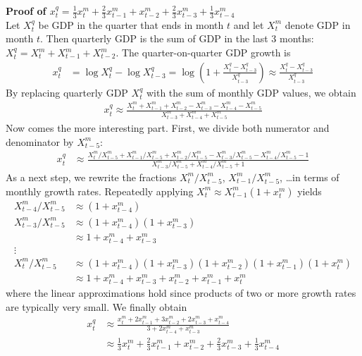 \documentclass[12pt,a4paper]{scrartcl}
\begin{document}
	

\textbf{Proof of $x_t^q = \frac{1}{3} x_t^m + \frac{2}{3} x_{t-1}^m + x_{t-2}^m + \frac{2}{3} x_{t-3}^m + \frac{1}{3} x_{t-4}^m$}\\

Let $X^q_t$ be GDP in the quarter that ends in month $t$ and let $X^m_t$ denote GDP in month $t$. Then quarterly GDP is the sum of GDP in the last 3 months: $X^q_t = X^m_t + X^m_{t-1} + X^m_{t-2}$. The quarter-on-quarter GDP growth is
\begin{align}
x^q_t &= \log X^q_t - \log X^q_{t-3} 
= \log(1 + \frac{X^q_t-X^q_{t-3}}{X^q_{t-3}}) 
\approx \frac{X^q_t-X^q_{t-3}}{X^q_{t-3}}
\end{align}
By replacing quarterly GDP $X^q_t$ with the sum of monthly GDP values, we obtain
\begin{align}
x^q_t \approx \frac{X^m_t + X^m_{t-1} + X^m_{t-2} - X^m_{t-3} - X^m_{t-4} - X^m_{t-5}}{X^m_{t-3} + X^m_{t-4} + X^m_{t-5}}
\end{align}
Now comes the more interesting part. First, we divide both numerator and denominator by $X^m_{t-5}$:
\begin{align}
x^q_t &\approx \frac{X^m_t/X^m_{t-5} + X^m_{t-1}/X^m_{t-5} + X^m_{t-2}/X^m_{t-5} - X^m_{t-3}/X^m_{t-5} - X^m_{t-4}/X^m_{t-5} - 1}{X^m_{t-3}/X^m_{t-5} + X^m_{t-4}/X^m_{t-5} + 1}
\end{align}
As a next step, we rewrite the fractions $X_t^m/X_{t-5}^m$, $X_{t-1}^m/X_{t-5}^m$, \dots in terms of monthly growth rates. Repeatedly applying $X_t^m \approx X_{t-1}^m(1+x_{t}^m)$ yields
\begin{align}
X_{t-4}^m/X_{t-5}^m &\approx (1+x_{t-4}^m) \\
X_{t-3}^m/X_{t-5}^m &\approx (1+x_{t-4}^m)(1+x_{t-3}^m) \\
&\approx 1 + x_{t-4}^m + x_{t-3}^m \\
\vdots &  \\
X_t^m/X_{t-5}^m &\approx (1+x_{t-4}^m)(1+x_{t-3}^m)(1+x_{t-2}^m)(1+x_{t-1}^m)(1+x_t^m) \\
&\approx 1 + x_{t-4}^m + x_{t-3}^m + x_{t-2}^m + x_{t-1}^m + x_t^m
\end{align}
where the linear approximations hold since products of two or more growth rates are typically very small. We finally obtain
\begin{align}
x_t^q &\approx \frac{x_t^m + 2x_{t-1}^m + 3x_{t-2}^m + 2x_{t-3}^m + x_{t-4}^m}{3 + 2 x_{t-4}^m + x_{t-3}^m} \\
&\approx \frac{1}{3} x_t^m + \frac{2}{3} x_{t-1}^m + x_{t-2}^m + \frac{2}{3} x_{t-3}^m + \frac{1}{3} x_{t-4}^m
\end{align}
\end{document}
